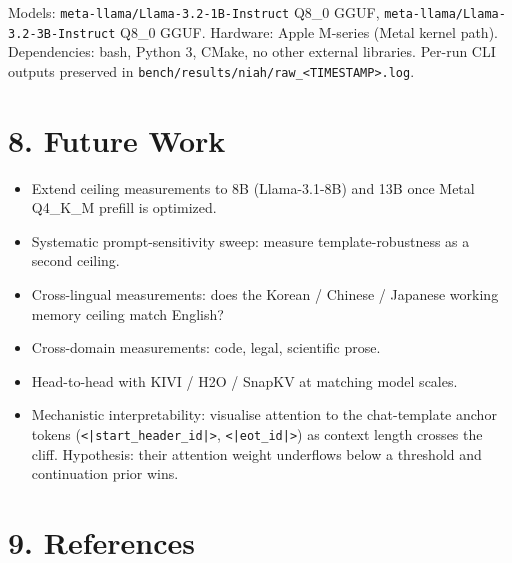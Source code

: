 \documentclass[11pt]{article}
\begin{document}
Models: \texttt{meta-llama/Llama-3.2-1B-Instruct} Q8\_0 GGUF, \texttt{meta-llama/Llama-3.2-3B-Instruct} Q8\_0 GGUF. Hardware: Apple M-series (Metal kernel path). Dependencies: bash, Python 3, CMake, no other external libraries. Per-run CLI outputs preserved in \texttt{bench/results/niah/raw\_<TIMESTAMP>.log}.


\section*{8. Future Work}


\begin{itemize}
\item Extend ceiling measurements to 8B (Llama-3.1-8B) and 13B once Metal Q4\_K\_M prefill is optimized.
\item Systematic prompt-sensitivity sweep: measure template-robustness as a second ceiling.
\item Cross-lingual measurements: does the Korean / Chinese / Japanese working memory ceiling match English?
\item Cross-domain measurements: code, legal, scientific prose.
\item Head-to-head with KIVI / H2O / SnapKV at matching model scales.
\item Mechanistic interpretability: visualise attention to the chat-template anchor tokens (\texttt{<|start\_header\_id|>}, \texttt{<|eot\_id|>}) as context length crosses the cliff. Hypothesis: their attention weight underflows below a threshold and continuation prior wins.
\end{itemize}


\section*{9. References}
\end{document}
